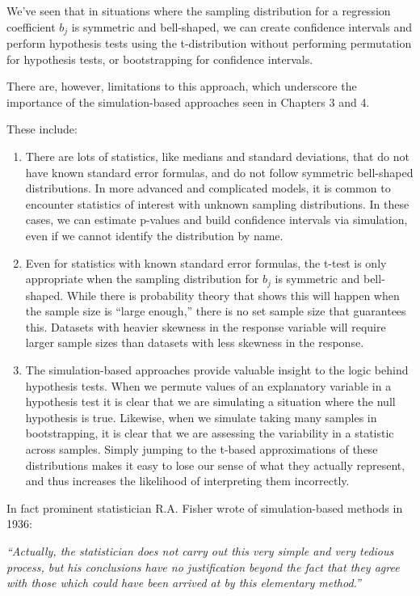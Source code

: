\documentclass[
  letterpaper,
  DIV=11,
  numbers=noendperiod]{scrreprt}
\begin{document}
We've seen that in situations where the sampling distribution for a
regression coefficient \(b_j\) is symmetric and bell-shaped, we can
create confidence intervals and perform hypothesis tests using the
t-distribution without performing permutation for hypothesis tests, or
bootstrapping for confidence intervals.

There are, however, limitations to this approach, which underscore the
importance of the simulation-based approaches seen in Chapters 3 and 4.

These include:

\begin{enumerate}
\def\labelenumi{\arabic{enumi}.}
\item
  There are lots of statistics, like medians and standard deviations,
  that do not have known standard error formulas, and do not follow
  symmetric bell-shaped distributions. In more advanced and complicated
  models, it is common to encounter statistics of interest with unknown
  sampling distributions. In these cases, we can estimate p-values and
  build confidence intervals via simulation, even if we cannot identify
  the distribution by name.
\item
  Even for statistics with known standard error formulas, the t-test is
  only appropriate when the sampling distribution for \(b_j\) is
  symmetric and bell-shaped. While there is probability theory that
  shows this will happen when the sample size is ``large enough,'' there
  is no set sample size that guarantees this. Datasets with heavier
  skewness in the response variable will require larger sample sizes
  than datasets with less skewness in the response.
\item
  The simulation-based approaches provide valuable insight to the logic
  behind hypothesis tests. When we permute values of an explanatory
  variable in a hypothesis test it is clear that we are simulating a
  situation where the null hypothesis is true. Likewise, when we
  simulate taking many samples in bootstrapping, it is clear that we are
  assessing the variability in a statistic across samples. Simply
  jumping to the t-based approximations of these distributions makes it
  easy to lose our sense of what they actually represent, and thus
  increases the likelihood of interpreting them incorrectly.
\end{enumerate}

In fact prominent statistician R.A. Fisher wrote of simulation-based
methods in 1936:

\emph{``Actually, the statistician does not carry out this very simple
and very tedious process, but his conclusions have no justification
beyond the fact that they agree with those which could have been arrived
at by this elementary method.''}
\end{document}
